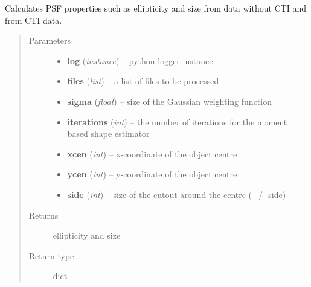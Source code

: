 \documentclass[a4paper,11pt,english]{sphinxmanual}
\begin{document}
\begin{fulllineitems}
\label{reduction:analysis.testCTIcorrection.testCTIcorrection}
Calculates PSF properties such as ellipticity and size from data without CTI and from
CTI data.
\begin{quote}\begin{description}
\item[{Parameters}] \leavevmode\begin{itemize}
\item {} 
\textbf{log} (\emph{instance}) -- python logger instance

\item {} 
\textbf{files} (\emph{list}) -- a list of files to be processed

\item {} 
\textbf{sigma} (\emph{float}) -- size of the Gaussian weighting function

\item {} 
\textbf{iterations} (\emph{int}) -- the number of iterations for the moment based shape estimator

\item {} 
\textbf{xcen} (\emph{int}) -- x-coordinate of the object centre

\item {} 
\textbf{ycen} (\emph{int}) -- y-coordinate of the object centre

\item {} 
\textbf{side} (\emph{int}) -- size of the cutout around the centre (+/- side)

\end{itemize}

\item[{Returns}] \leavevmode
ellipticity and size

\item[{Return type}] \leavevmode
dict

\end{description}\end{quote}

\end{fulllineitems}

\end{document}
